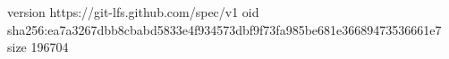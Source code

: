 version https://git-lfs.github.com/spec/v1
oid sha256:ea7a3267dbb8cbabd5833e4f934573dbf9f73fa985be681e36689473536661e7
size 196704
